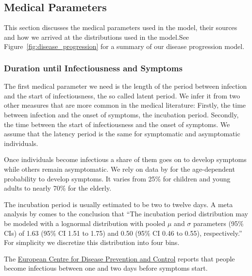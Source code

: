 \subsection{Medical Parameters}
\label{sec:medical_params}

This section discusses the medical parameters used in the model, their sources and how we
arrived at the distributions used in the model.\footnotemark See
Figure~\ref{fig:disease_progression} for a summary of our disease progression model.


\subsubsection{Duration until Infectiousness and Symptoms}

The first medical parameter we need is the length of the period between infection and the
start of infectiousness, the so called latent period. We infer it from two other measures
that are more common in the medical literature: Firstly, the time between infection and
the onset of symptoms, the incubation period. Secondly, the time between the start of
infectiousness and the onset of symptoms. We assume that the latency period is the same
for symptomatic and asymptomatic individuals.

Once individuals become infectious a share of them goes on to develop symptoms while
others remain asymptomatic. We rely on data by \cite{Davies2020} for the age-dependent
probability to develop symptoms. It varies from 25\% for children and young adults to
nearly 70\% for the elderly.

The incubation period is usually estimated to be two to twelve days. A meta analysis by
\citet{McAloon2020} comes to the conclusion that ``The incubation period distribution may
be modeled with a lognormal distribution with pooled $\mu$ and $\sigma$ parameters (95\%
CIs) of 1.63 (95\% CI 1.51 to 1.75) and 0.50 (95\% CI 0.46 to 0.55), respectively.'' For
simplicity we discretize this distribution into four bins.

The \href{https://bit.ly/3pi18Ax}{European Centre for Disease Prevention and Control}
reports that people become infectious between one and two days before symptoms
start.\footnotemark

